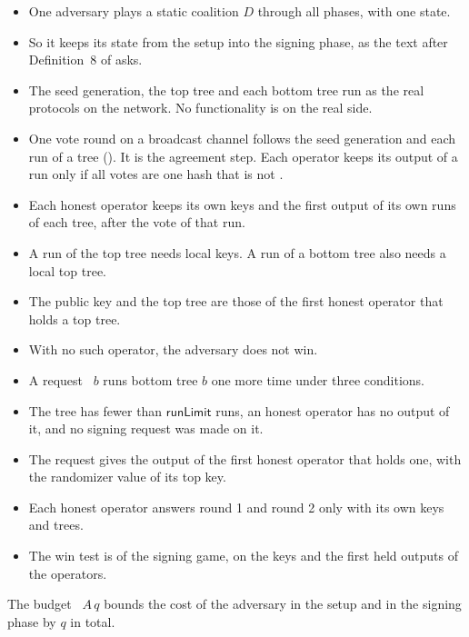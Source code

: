 \documentclass[11pt]{article}
\begin{document}
\begin{itemize}
\item One adversary  plays a static coalition $D$ through all phases, with
one state.
\item So it keeps its state from the setup into the signing phase, as the text after Definition~8
of \cite{GJM+21} asks.
\item The seed generation, the top tree and each bottom tree run as the real protocols on the
network. No functionality is on the real side.
\item One vote round on a broadcast channel follows the seed generation and each run of a tree
(). It is the agreement step. Each operator keeps its output of a run only if all
votes are one hash that is not .
\item Each honest operator keeps its own keys and the first output of its own runs of each tree,
after the vote of that run.
\item A run of the top tree needs local keys. A run of a bottom tree also needs a local top tree.
\item The public key and the top tree are those of the first honest operator that holds a top
tree.
\item With no such operator, the adversary does not win.
\item A request ~$b$ runs bottom tree $b$ one more time under three conditions.
\item The tree has fewer than $\mathsf{runLimit}$ runs, an honest operator has no output of it, and
no signing request was made on it.
\item The request gives the output of the first honest operator that holds one, with the
randomizer value of its top key.
\item Each honest operator answers round 1 and round 2 only with its own keys and trees.
\item The win test is  of the signing game, on the keys and the first held
outputs of the operators.
\end{itemize}
The budget ~$A\,q$ bounds the cost of the adversary in the setup and in the
signing phase by $q$ in total.
\end{document}
